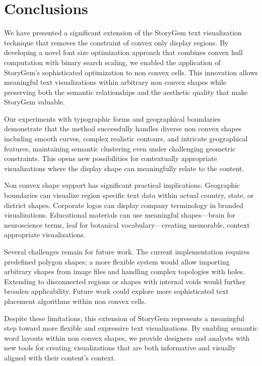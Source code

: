 \documentclass{vgtc}                          %
\begin{document}
\section{Conclusions}

We have presented a significant extension of the StoryGem text visualization technique that removes the constraint of convex only display regions.
By developing a novel font size optimization approach that combines convex hull computation with binary search scaling, we enabled the application of StoryGem's sophisticated optimization to non convex cells.
This innovation allows meaningful text visualizations within arbitrary non convex shapes while preserving both the semantic relationships and the aesthetic quality that make StoryGem valuable.

Our experiments with typographic forms and geographical boundaries demonstrate that the method successfully handles diverse non convex shapes including smooth curves, complex realistic contours, and intricate geographical features, maintaining semantic clustering even under challenging geometric constraints.
This opens new possibilities for contextually appropriate visualizations where the display shape can meaningfully relate to the content.

Non convex shape support has significant practical implications.
Geographic boundaries can visualize region specific text data within actual country, state, or district shapes.
Corporate logos can display company terminology in branded visualizations.
Educational materials can use meaningful shapes—brain for neuroscience terms, leaf for botanical vocabulary—creating memorable, context appropriate visualizations.

Several challenges remain for future work.
The current implementation requires predefined polygon shapes; a more flexible system would allow importing arbitrary shapes from image files and handling complex topologies with holes.
Extending to disconnected regions or shapes with internal voids would further broaden applicability.
Future work could explore more sophisticated text placement algorithms within non convex cells.

Despite these limitations, this extension of StoryGem represents a meaningful step toward more flexible and expressive text visualizations.
By enabling semantic word layouts within non convex shapes, we provide designers and analysts with new tools for creating visualizations that are both informative and visually aligned with their content's context.



\end{document}
